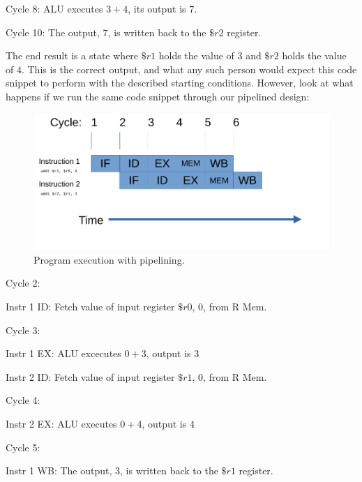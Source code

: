 \documentclass[12pt,twoside]{reedthesis}
\begin{document}
Cycle 8: ALU executes $3 + 4$, its output is $7$.

Cycle 10: The output, $7$, is written back to the $\$r2$ register.

\vspace{5mm}

The end result is a state where $\$r1$ holds the value of $3$ and $\$r2$ holds the value of $4$. This is the correct output, and what any such person would expect this code snippet to perform with the described starting conditions. However, look at what happens if we run the same code snippet through our pipelined design:

\begin{figure}[h!]

	\centering
	\includegraphics[scale=0.7]{pipeline}
	\caption{Program execution with pipelining.}
	\label{pipeline}
\end{figure}

Cycle 2:

\qquad Instr 1 ID:  Fetch value of input register $\$r0$, $0$, from R Mem.

Cycle 3:

\qquad Instr 1 EX: ALU excecutes $0 + 3$, output is $3$

\qquad Instr 2 ID: Fetch value of input register $\$r1$, $0$, from R Mem.

Cycle 4:

\qquad Instr 2 EX: ALU executes $0 + 4$, output is $4$

Cycle 5:

\qquad Instr 1 WB: The output, $3$, is written back to the $\$r1$ register.
\end{document}

